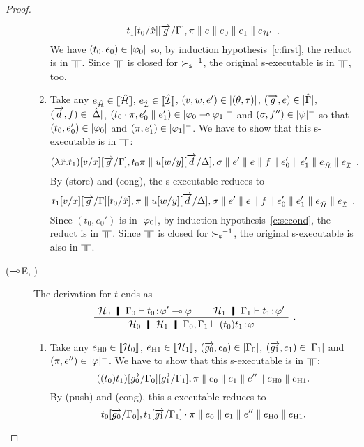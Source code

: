 \begin{proof}
\begin{description}
\begin{enumerate}[label=\textit{(\arabic{*})}]
	       \[
		t_1[{t_0}/\hat x][\overrightarrow{g}/\Gamma],\pi\parallel{e}\parallel
	       e_0\parallel{e_1}\parallel e_{\mathcal H'}\enspace.
	       \]
	       We have $({t_0}, e_0)\in|{\varphi_0}|$ so, by
	       induction hypothesis~\ref{c:first},
	       the reduct is in $\bbot$.
	       Since $\bbot$ is closed for ${\succ_{\mathsf s}}^{-1}$, the original
	       s-executable is in $\bbot$, too.
	 \item Take any
	       $e_{\hat{\mathcal{H}}}\in \llbracket{\hat{\mathcal{H}}}\rrbracket$,
	       $e_{\hat{\mathcal{I}}}\in \llbracket{\hat{\mathcal{I}}}\rrbracket$,
	       $(v,w,e')\in|{(\theta,\tau)}|$,
	       $(\overrightarrow g, e)\in|{\hat{\Gamma}}|$,
	       $(\overrightarrow d, f)\in|{\hat{\Delta}}|$,
	       $(t_0\cdot\pi,e_0'\parallel e_1')\in|{\varphi_0\multimap\varphi_1}|^-$ and
	       $(\sigma,f'')\in|{\psi}|^-$ so that
	       $(t_0,e_0')\in|{\varphi_0}|$ and
	       $(\pi,e_1')\in|{\varphi_1}|^-$.
	       We have to show that this s-executable is in $\bbot$:
	       \[
	       (\lambda \hat x. t_1)[v/x][\overrightarrow{g}/\Gamma],t_0\pi\parallel
	       u[w/y][\overrightarrow{d}/\Delta],\sigma\parallel
	       e'\parallel {e}\parallel {f} \parallel{e_0'}\parallel{e_1'}\parallel
	       e_{\hat{\mathcal{H}}}\parallel e_{\hat{\mathcal{I}}}\enspace.
	       \]
	       By (store) and (cong), the s-executable reduces to
	       \[
		t_1[v/x][\overrightarrow{g}/\Gamma][{t_0}/\hat x],\pi\parallel
	       u[w/y][\overrightarrow{d}/\Delta],\sigma\parallel
	       e'\parallel {e}\parallel {f} \parallel{e_0'}\parallel{e_1'}\parallel
	       e_{\hat{\mathcal{H}}}\parallel e_{\hat{\mathcal{I}}}\enspace.
	       \]
	       Since $({t_0},e_0')$ is in $|{\varphi_0}|$,
	       by induction hypothesis~\ref{c:second}, the reduct is in
	       $\bbot$.  Since $\bbot$ is closed for ${\succ_{\mathsf s}}^{-1}$,
	       the original s-executable is also in $\bbot$.
	\end{enumerate}
   \item[($\multimap$E, \textminus)]
	The derivation for $t$ ends as
	\[
	\aseq{\hyp{_0}\G_0}{\tj{t_0}{\phi'\limp\phi}}
	\aseq{\hyp{_1}\G_1}{\tj{t_1}{\phi'}}
	\bseq{\hyp{_0}\hyp{_1}\G_0,\G_1}{\tj{(t_0)t_1}{\phi}}
	\DisplayProof\enspace.
	\]
	\begin{enumerate}[label=\textit{(\arabic{*})}]
	 \item Take any
	       $e_{\mathrm{H0}}\in\llbracket{\mathcal H_0}\rrbracket$,
	       $e_{\mathrm{H1}}\in\llbracket{\mathcal H_1}\rrbracket$,
	       $(\overrightarrow{g_0},{e_0})\in|{\Gamma_0}|$,
	       $(\overrightarrow{g_1},{e_1})\in|{\Gamma_1}|$ and
	       $(\pi,e'')\in|{\varphi}|^-$.
	       We have to show that this s-executable is in $\bbot$:
	       \[
		((t_0)t_1)[\overrightarrow{g_0}/\Gamma_0][\overrightarrow{g_1}/\Gamma_1],\pi\parallel
	       {e_0}\parallel {e_1}\parallel e''\parallel e_{\mathrm{H0}}\parallel e_{\mathrm{H1}}.
	       \]
	       By (push) and (cong), this s-executable reduces to
	       \[
		t_0[\overrightarrow{g_0}/\Gamma_0], t_1[\overrightarrow{g_1}/\Gamma_1]\cdot \pi
	       \parallel {e_0}\parallel {e_1}\parallel e''\parallel e_{\mathrm{H0}}\parallel e_{\mathrm{H1}}.
\]
\end{enumerate}
\end{description}
\end{proof}

